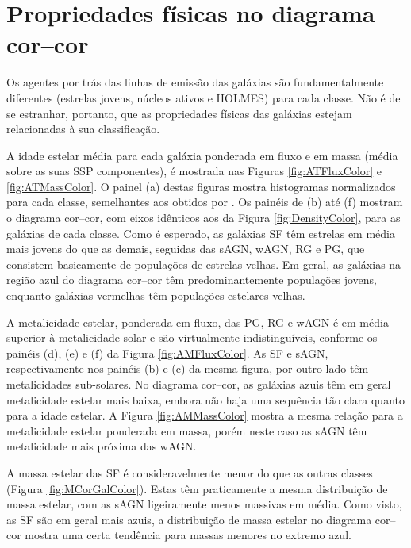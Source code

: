 
\section{Propriedades físicas no diagrama cor--cor}
\label{sec:Analise:PropFisicas}

Os agentes por trás das linhas de emissão das galáxias são fundamentalmente
diferentes (estrelas jovens, núcleos ativos e HOLMES) para cada classe. Não é de
se estranhar, portanto, que as propriedades físicas das galáxias estejam
relacionadas à sua classificação.

A idade estelar média para cada galáxia ponderada em fluxo e em massa (média
sobre as suas SSP componentes), é mostrada nas Figuras \ref{fig:ATFluxColor} e
\ref{fig:ATMassColor}. O painel (a) destas figuras mostra histogramas
normalizados para cada classe, semelhantes aos obtidos por \citet[figura
10]{CidFernandes2011}. Os painéis de (b) até (f) mostram o diagrama cor--cor,
com eixos idênticos aos da Figura \ref{fig:DensityColor}, para as galáxias de
cada classe. Como é esperado, as galáxias SF têm estrelas em média mais jovens
do que as demais, seguidas das sAGN, wAGN, RG e PG, que consistem basicamente de
populações de estrelas velhas. Em geral, as galáxias na região azul do diagrama
cor--cor têm predominantemente populações jovens, enquanto galáxias vermelhas
têm populações estelares velhas.

A metalicidade estelar, ponderada em fluxo, das PG, RG e wAGN é em média
superior à metalicidade solar e são virtualmente indistinguíveis, conforme os
painéis (d), (e) e (f) da Figura \ref{fig:AMFluxColor}. As SF e sAGN,
respectivamente nos painéis (b) e (c) da mesma figura, por outro lado têm
metalicidades sub-solares. No diagrama cor--cor, as galáxias azuis têm em geral
metalicidade estelar mais baixa, embora não haja uma sequência tão clara quanto
para a idade estelar. A Figura \ref{fig:AMMassColor} mostra a mesma relação para
a metalicidade estelar ponderada em massa, porém neste caso as sAGN têm
metalicidade mais próxima das wAGN.

A massa estelar das SF é consideravelmente menor do que as outras classes
(Figura \ref{fig:MCorGalColor}). Estas têm praticamente a mesma distribuição de
massa estelar, com as sAGN ligeiramente menos massivas em média. Como visto, as
SF são em geral mais azuis, a distribuição de massa estelar no diagrama cor--cor
mostra uma certa tendência para massas menores no extremo azul.


